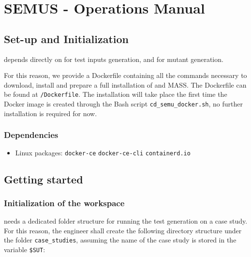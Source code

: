 
\chapter{SEMUS - Operations Manual}
\label{chapter:semus:operations}

\section{Set-up and Initialization}
\label{sec:install:semus}

\SEMUS depends directly on \SEMU for test inputs generation, and \MASS for mutant generation.

For this reason, we provide a Dockerfile containing all the commands necessary to download, install and prepare a full installation of \SEMU and MASS. The Dockerfile can be found at \texttt{\SEMUS/Dockerfile}. The installation will take place the first time the Docker image is created through the Bash script \texttt{cd\_semu\_docker.sh}, no further installation is required for now.

\subsection{Dependencies}


\begin{itemize}
	\item Linux packages: \texttt{docker-ce} \texttt{docker-ce-cli} \texttt{containerd.io}
\end{itemize}


\section{Getting started}

\subsection{Initialization of the \SEMUS workspace}
\label{sec:semus:initialization}

\SEMUS needs a dedicated folder structure for running the test generation on a case study. 
For this reason, the engineer shall create the following directory structure under the folder \texttt{case\_studies}, assuming the name of the case study is stored in the variable \texttt{\$SUT}:

